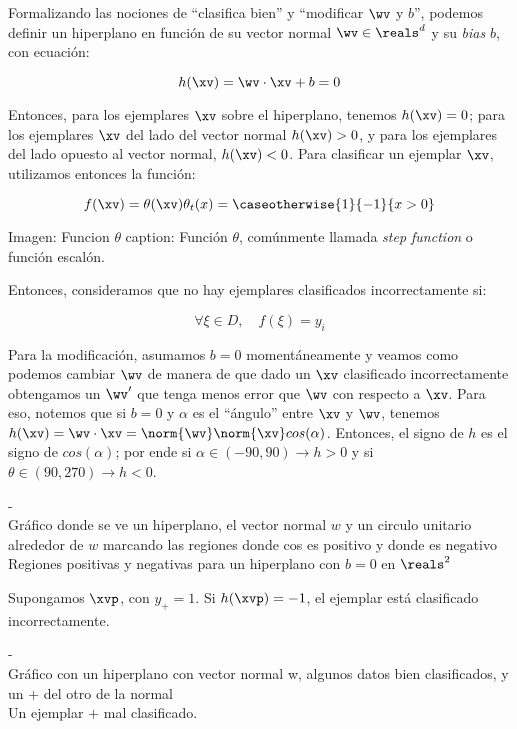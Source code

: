 Formalizando las nociones de ``clasifica bien'' y ``modificar $\wv$ y $b$'', podemos definir un hiperplano en función de su vector normal $\wv \in \reals^{d}$ y su \textit{bias} $b$, con ecuación:

\begin{equation}
 h(\xv)= \wv \cdot \xv + b = 0
 \end{equation}

Entonces, para los ejemplares $\xv$ sobre el hiperplano, tenemos $h(\xv)=0$; para los ejemplares $\xv$ del lado del vector normal $h(\xv)>0$, y para los ejemplares del lado opuesto al vector normal, $h(\xv)<0$. Para clasificar un ejemplar $\xv$, utilizamos entonces la función:

\begin{equation}
 f(\xv)= \theta(\xv) \\
\theta_t(x) = \caseotherwise{1}{-1}{x> 0}
 \end{equation}

Imagen: Funcion $\theta$
caption: Función $\theta$, comúnmente llamada \textit{step function} o función escalón.


Entonces, consideramos que no hay ejemplares clasificados incorrectamente si:

\begin{equation}
\forall \xi \in D, \quad f(\xi) = y_i
\end{equation}

Para la modificación, asumamos $b=0$ momentáneamente y veamos como podemos cambiar $\wv$ de manera de que dado un $\xv$ clasificado incorrectamente obtengamos un $\wv'$ que tenga menos error que $\wv$ con respecto a $\xv$. Para eso, notemos que si $b=0$ y $\alpha$ es el ``ángulo'' entre $\xv$ y $\wv$, tenemos $h(\xv)=\wv \cdot \xv= \norm{\wv} \norm{\xv} cos(\alpha)$. Entonces, el signo de $h$ es el signo de $cos(\alpha)$; por ende si $\alpha \in (-90,90) \rightarrow h>0$ y si $\theta \in (90,270) \rightarrow h < 0 $. 

-\\
Gráfico donde se ve un hiperplano, el vector normal $w$ y un circulo unitario alrededor de $w$ marcando las regiones donde cos es positivo y donde es negativo\\
Regiones positivas y negativas para un hiperplano con $b=0$ en $\reals^2$



Supongamos $\xvp$, con $y_{+}=1$. Si $h(\xvp)=-1$, el ejemplar está clasificado incorrectamente. 

-\\
Gráfico con un hiperplano con vector normal w, algunos datos bien clasificados, y un + del otro de la normal\\
Un ejemplar $+$ mal clasificado.\\

